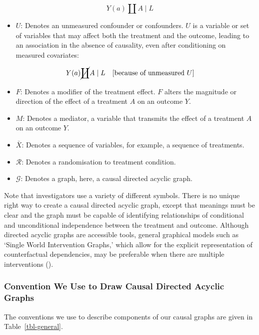 \documentclass[
  single column]{article}
\providecommand{\tightlist}{%
  \setlength{\itemsep}{0pt}\setlength{\parskip}{0pt}}\usepackage{longtable,booktabs,array}
\begin{document}
\[
Y(a) \coprod A \mid L
\]

\begin{itemize}
\tightlist
\item
  \textbf{\(U\)}: Denotes an unmeasured confounder or confounders. \(U\)
  is a variable or set of variables that may affect both the treatment
  and the outcome, leading to an association in the absence of
  causality, even after conditioning on measured covariates:
\end{itemize}

\[
Y(a) \cancel{\coprod} A \mid L \quad \text{[because of unmeasured } U]
\]

\begin{itemize}
\item
  \textbf{\(F\)}: Denotes a modifier of the treatment effect. \(F\)
  alters the magnitude or direction of the effect of a treatment \(A\)
  on an outcome \(Y\).
\item
  \textbf{\(M\)}: Denotes a mediator, a variable that transmits the
  effect of a treatment \(A\) on an outcome \(Y\).
\item
  \textbf{\(\bar{X}\)}: Denotes a sequence of variables, for example, a
  sequence of treatments.
\item
  \textbf{\(\mathcal{R}\)}: Denotes a randomisation to treatment
  condition.
\item
  \textbf{\(\mathcal{G}\)}: Denotes a graph, here, a causal directed
  acyclic graph.
\end{itemize}

Note that investigators use a variety of different symbols. There is no
unique right way to create a causal directed acyclic graph, except that
meanings must be clear and the graph must be capable of identifying
relationships of conditional and unconditional independence between the
treatment and outcome. Although directed acyclic graphs are accessible
tools, general graphical models such as `Single World Intervention
Graphs,' which allow for the explicit representation of counterfactual
dependencies, may be preferable when there are multiple interventions
().

\subsubsection{Convention We Use to Draw Causal Directed Acyclic
Graphs}\label{convention-we-use-to-draw-causal-directed-acyclic-graphs}

The conventions we use to describe components of our causal graphs are
given in Table~\ref{tbl-general}.
\end{document}
